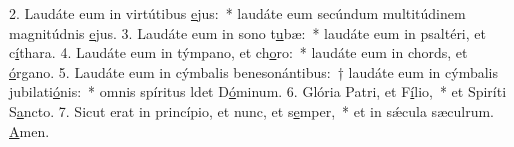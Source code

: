 2. Laudáte eum in virtútibus \uline{e}jus:~* laudáte eum secúndum multitúdinem magnitúdnis \uline{e}jus.
3. Laudáte eum in sono t\uline{u}bæ:~* laudáte eum in psaltéri, et c\uline{í}thara.
4. Laudáte eum in týmpano, et ch\uline{o}ro:~* laudáte eum in chords, et \uline{ó}rgano.
5. Laudáte eum in cýmbalis benesonántibus:~† laudáte eum in cýmbalis jubilati\uline{ó}nis:~* omnis spíritus ldet D\uline{ó}minum.
6. Glória Patri, et F\uline{í}lio,~* et Spiríti S\uline{a}ncto.
7. Sicut erat in princípio, et nunc, et s\uline{e}mper,~* et in sǽcula sæculrum. \uline{A}men.
